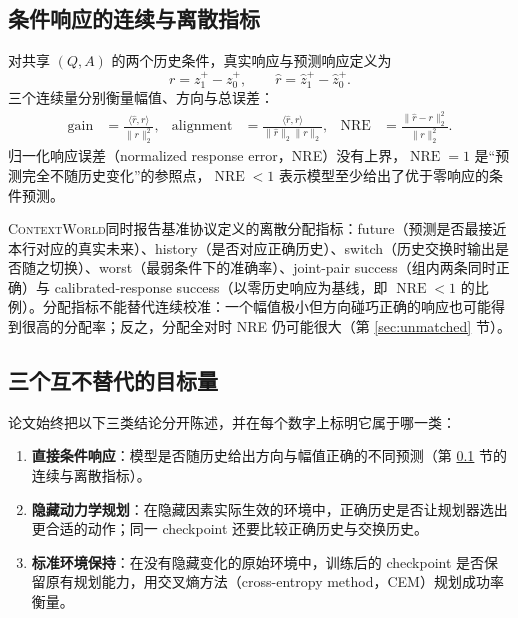 \documentclass[UTF8,zihao=-4,fontset=fandol]{ctexart}
\newcommand{\benchmark}{\textsc{ContextWorld}}
\begin{document}
\subsection{条件响应的连续与离散指标}
\label{sec:metrics}

对共享 $(Q,A)$ 的两个历史条件，真实响应与预测响应定义为
\begin{equation}
  r=z_1^+-z_0^+,\qquad \hat r=\hat z_1^+-\hat z_0^+ .
\end{equation}
三个连续量分别衡量幅值、方向与总误差：
\begin{align}
  \operatorname{gain}&=\frac{\langle \hat r,r\rangle}{\lVert r\rVert_2^2},&
  \operatorname{alignment}&=\frac{\langle \hat r,r\rangle}{\lVert \hat r\rVert_2\lVert r\rVert_2},&
  \operatorname{NRE}&=\frac{\lVert \hat r-r\rVert_2^2}{\lVert r\rVert_2^2}.
\end{align}
归一化响应误差（normalized response error，NRE）没有上界，$\operatorname{NRE}=1$ 是“预测完全不随历史变化”的参照点，$\operatorname{NRE}<1$ 表示模型至少给出了优于零响应的条件预测。

\benchmark 同时报告基准协议定义的离散分配指标：future（预测是否最接近本行对应的真实未来）、history（是否对应正确历史）、switch（历史交换时输出是否随之切换）、worst（最弱条件下的准确率）、joint-pair success（组内两条同时正确）与 calibrated-response success（以零历史响应为基线，即 $\operatorname{NRE}<1$ 的比例）。分配指标不能替代连续校准：一个幅值极小但方向碰巧正确的响应也可能得到很高的分配率；反之，分配全对时 NRE 仍可能很大（第 \ref{sec:unmatched} 节）。

\subsection{三个互不替代的目标量}
\label{sec:estimands}

论文始终把以下三类结论分开陈述，并在每个数字上标明它属于哪一类：

\begin{enumerate}
  \item \textbf{直接条件响应}：模型是否随历史给出方向与幅值正确的不同预测（第 \ref{sec:metrics} 节的连续与离散指标）。
  \item \textbf{隐藏动力学规划}：在隐藏因素实际生效的环境中，正确历史是否让规划器选出更合适的动作；同一 checkpoint 还要比较正确历史与交换历史。
  \item \textbf{标准环境保持}：在没有隐藏变化的原始环境中，训练后的 checkpoint 是否保留原有规划能力，用交叉熵方法（cross-entropy method，CEM）规划成功率衡量。
\end{enumerate}
\end{document}
